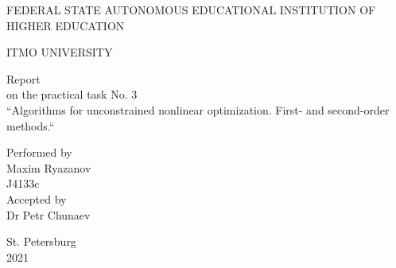 \documentclass[12pt,a4paper]{report}
\begin{document}
	\vspace*{15ex}
	\begin{center}
		FEDERAL STATE AUTONOMOUS EDUCATIONAL INSTITUTION OF HIGHER EDUCATION 
		
		ITMO UNIVERSITY
		\vspace*{30ex}
		
		Report\\
		on the practical task No. 3\\
		``Algorithms for unconstrained nonlinear optimization. First- and second-order methods.``
	\end{center}
	\vspace{25ex}
	\begin{flushright}
		Performed by\\
		Maxim Ryazanov\\
		J4133c\\
		Accepted by\\
		Dr Petr Chunaev
	\end{flushright}
	\vspace{20ex}
	\begin{center}
		St. Petersburg\\
		2021
	\end{center}
	\newpage

    
	
	
	
	
\end{document}
